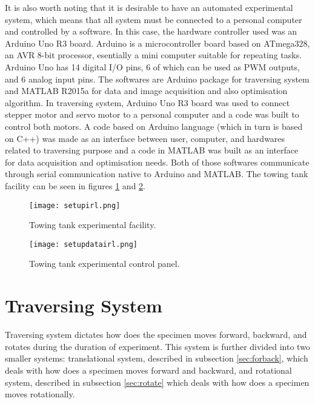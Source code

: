 It is also worth noting that it is desirable to have an automated experimental system, which means that all system must be connected to a personal computer and controlled by a software. In this case, the hardware controller used was an Arduino Uno R3 board. Arduino is a microcontroller board based on ATmega328, an AVR 8-bit processor, esentially a mini computer suitable for repeating tasks. Arduino Uno has 14 digital I/O pins, 6 of which can be used as PWM outputs, and 6 analog input pins. The softwares are Arduino package for traversing system and MATLAB R2015a for data and image acquisition and also optimisation algorithm. In traversing system, Arduino Uno R3 board was used to connect stepper motor and servo motor to a personal computer and a code was built to control both motors. A code based on Arduino language (which in turn is based on C++) was made as an interface between user, computer, and hardwares related to traversing purpose and a code in MATLAB was built as an interface for data acquisition and optimisation needs. Both of those softwares communicate through serial communication native to Arduino and MATLAB. The towing tank facility can be seen in figures \ref{fig:setupirl} and \ref{fig:setupdatairl}.
\begin{figure}[H]
    \centering
    \texttt{[image: setupirl.png]}
    \caption{Towing tank experimental facility.}
    \label{fig:setupirl}
\end{figure}
\begin{figure}[H]
    \centering
    \texttt{[image: setupdatairl.png]}
    \caption{Towing tank experimental control panel.}
    \label{fig:setupdatairl}
\end{figure}
\section{Traversing System}
\label{sec:trans}
Traversing system dictates how does the specimen moves forward, backward, and rotates during the duration of experiment. This system is further divided into two smaller systems: translational system, described in subsection \ref{sec:forback}, which deals with how does a specimen moves forward and backward, and rotational system, described in subsection \ref{sec:rotate} which deals with how does a specimen moves rotationally.

